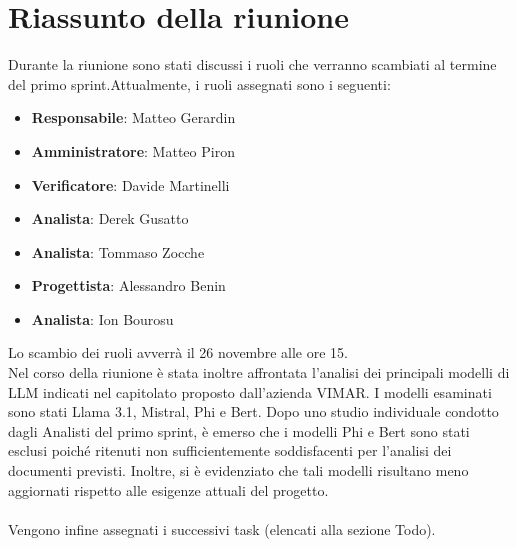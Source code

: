 \section{Riassunto della riunione}
Durante la riunione sono stati discussi i ruoli che verranno scambiati al termine del primo sprint.Attualmente, i ruoli assegnati sono i seguenti:
\begin{itemize}
    \item \textbf{Responsabile}: Matteo Gerardin 
    \item \textbf{Amministratore}: Matteo Piron 
    \item \textbf{Verificatore}: Davide Martinelli
    \item \textbf{Analista}: Derek Gusatto
    \item \textbf{Analista}: Tommaso Zocche
    \item \textbf{Progettista}: Alessandro Benin
    \item \textbf{Analista}: Ion Bourosu
\end{itemize}
Lo scambio dei ruoli avverrà il 26 novembre alle ore 15.
\\
Nel corso della riunione è stata inoltre affrontata l’analisi dei principali modelli di LLM indicati nel capitolato proposto dall’azienda VIMAR. I modelli esaminati sono stati Llama 3.1, Mistral, Phi e Bert. Dopo uno studio individuale condotto dagli Analisti del primo sprint, è emerso che i modelli Phi e Bert sono stati esclusi poiché ritenuti non sufficientemente soddisfacenti per l’analisi dei documenti previsti. Inoltre, si è evidenziato che tali modelli risultano meno aggiornati rispetto alle esigenze attuali del progetto.
\\
\\
Vengono infine assegnati i successivi task (elencati alla sezione Todo).


